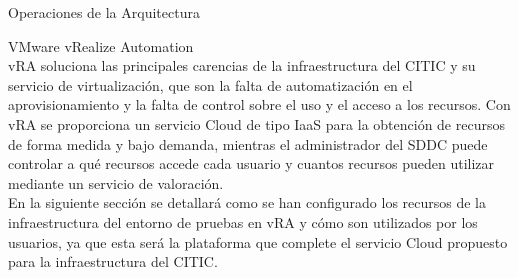 \begin{subsection}{Operaciones de la Arquitectura}
\begin{subsubsection}{VMware vRealize Automation}
        \\
        vRA soluciona las principales carencias de la infraestructura del CITIC y su servicio de virtualización, que son la falta de automatización en el aprovisionamiento y la falta de control sobre el uso y el acceso a los recursos. Con vRA se proporciona un servicio Cloud de tipo IaaS para la obtención de recursos de forma medida y bajo demanda, mientras el administrador del SDDC puede controlar a qué recursos accede cada usuario y cuantos recursos pueden utilizar mediante un servicio de valoración.
        \\
        En la siguiente sección se detallará como se han configurado los recursos de la infraestructura del entorno de pruebas en vRA y cómo son utilizados por los usuarios, ya que esta será la plataforma que complete el servicio Cloud propuesto para la infraestructura del CITIC.


        



\end{subsubsection}
\end{subsection}
